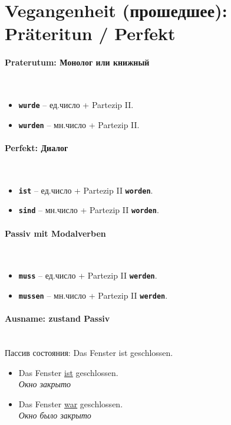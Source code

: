 \documentclass[12pt,a4paper]{report}
\newcommand{\term}[1]{\texttt{\textbf{#1}}}
\newcommand{\satzew}[1]{\underline{#1}}
\newcommand{\ubersatze}[1]{\textit{#1}}
\begin{document}
\section{Vegangenheit (прошедшее): Präteritun / Perfekt}

\paragraph{Praterutum: Монолог или книжный} ~\\
\begin{itemize}
\item \term{wurde} -- ед.число + Partezip II.
\item \term{wurden} -- мн.число + Partezip II.
\end{itemize}

\paragraph{Perfekt: Диалог} ~\\
\begin{itemize}
\item \term{ist} -- ед.число + Partezip II \term{worden}.
\item \term{sind} -- мн.число + Partezip II \term{worden}.
\end{itemize}

\paragraph{Passiv mit Modalverben} ~\\
\begin{itemize}
\item \term{muss} -- ед.число + Partezip II \term{werden}.
\item \term{mussen} -- мн.число + Partezip II \term{werden}.
\end{itemize}

\paragraph{Ausname: zustand Passiv} ~\\

Пассив состояния: Das Fenster ist geschlossen. 

\begin{itemize}
\item Das Fenster \satzew{ist} geschlossen.
~\\ \ubersatze{Окно закрыто}
\item Das Fenster \satzew{war} geschlossen.
~\\ \ubersatze{Окно было закрыто}
\end{itemize}
\end{document}
